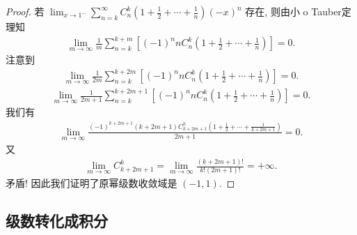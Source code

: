 \documentclass[../../main.tex]{subfiles}%
\begin{document}
\begin{proof}
若 $\lim_{x \to 1^-} \sum_{n=k}^{\infty} C_n^k \left(1 + \frac{1}{2} + \cdots + \frac{1}{n}\right) (-x)^n$ 存在, 则由小 o Tauber定理知
\begin{align*}
\lim_{m \to \infty} \frac{1}{m} \sum_{n=k}^{k + m} \left[(-1)^n n C_n^k \left(1 + \frac{1}{2} + \cdots + \frac{1}{n}\right)\right] = 0 .
\end{align*}
注意到
\begin{align*}
\lim_{m \to \infty} \frac{1}{2m} \sum_{n=k}^{k + 2m} \left[(-1)^n n C_n^k \left(1 + \frac{1}{2} + \cdots + \frac{1}{n}\right)\right] = 0.
\end{align*}
\begin{align*}
\lim_{m \to \infty} \frac{1}{2m + 1} \sum_{n=k}^{k + 2m + 1} \left[(-1)^n n C_n^k \left(1 + \frac{1}{2} + \cdots + \frac{1}{n}\right)\right] = 0 .
\end{align*}
我们有
\begin{align*}
\lim_{m \to \infty} \frac{(-1)^{k + 2m + 1} (k + 2m + 1) C_{k + 2m + 1}^k \left(1 + \frac{1}{2} + \cdots + \frac{1}{k + 2m + 1}\right)}{2m + 1} = 0.
\end{align*}
又
\begin{align*}
\lim_{m \to \infty} C_{k + 2m + 1}^k = \lim_{m \to \infty} \frac{(k + 2m + 1)!}{k! (2m + 1)!} = +\infty .
\end{align*}
矛盾! 因此我们证明了原幂级数收敛域是 $(-1, 1)$.
\end{proof}



\subsection{级数转化成积分}
\end{document}
